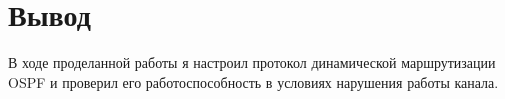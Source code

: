 \chapter{Вывод}
В ходе проделанной работы я настроил протокол динамической маршрутизации OSPF и проверил его работоспособность в условиях нарушения работы канала.
\endinput